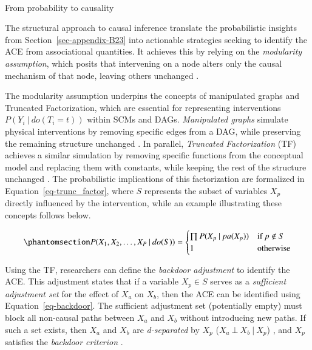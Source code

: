 \documentclass[
  authoryear,
  review,
  1p]{elsarticle}
\makeatletter
\let\oldparagraph\paragraph
\renewcommand{\paragraph}{
    \@ifstar
      \xxxParagraphStar
      \xxxParagraphNoStar
  }
\newcommand{\xxxParagraphStar}[1]{\oldparagraph*{#1}\mbox{}}
\newcommand{\xxxParagraphNoStar}[1]{\oldparagraph{#1}\mbox{}}
\makeatother
\begin{document}
\paragraph{From probability to causality}\label{sec-appendix-B23}

The structural approach to causal inference translate the probabilistic
insights from Section~\ref{sec-appendix-B23} into actionable strategies
seeking to identify the ACE from associational quantities. It achieves
this by relying on the \emph{modularity assumption}, which posits that
intervening on a node alters only the causal mechanism of that node,
leaving others unchanged \citep[pp.~34]{Neal_2020}.

The modularity assumption underpins the concepts of manipulated graphs
and Truncated Factorization, which are essential for representing
interventions \(P(Y_{i} \:|\:do(T_{i}=t))\) within SCMs and DAGs.
\emph{Manipulated graphs} simulate physical interventions by removing
specific edges from a DAG, while preserving the remaining structure
unchanged \citep[pp.~34]{Neal_2020}. In parallel, \emph{Truncated
Factorization} (TF) achieves a similar simulation by removing specific
functions from the conceptual model and replacing them with constants,
while keeping the rest of the structure unchanged \citep{Pearl_2010}.
The probabilistic implications of this factorization are formalized in
Equation~\ref{eq-trunc_factor}, where \(S\) represents the subset of
variables \(X_{p}\) directly influenced by the intervention, while an
example illustrating these concepts follows below.

\begin{equation}\phantomsection\label{eq-trunc_factor}{
P(X_{1}, X_{2}, \dots, X_{P} \:|\:do(S)) =
\begin{cases}
  \prod P(X_{p} \:|\:pa(X_{p}) ) & \text{if} \: p \not\in S \\
  1 \quad & \text{otherwise}
\end{cases}
}\end{equation}

Using the TF, researchers can define the \emph{backdoor adjustment} to
identify the ACE. This adjustment states that if a variable
\(X_{p} \in S\) serves as a \emph{sufficient adjustment set} for the
effect of \(X_{a}\) on \(X_{b}\), then the ACE can be identified using
Equation~\ref{eq-backdoor}. The sufficient adjustment set (potentially
empty) must block all non-causal paths between \(X_{a}\) and \(X_{b}\)
without introducing new paths. If such a set exists, then \(X_{a}\) and
\(X_{b}\) are \emph{d-separated} by \(X_{p}\)
(\(X_{a} \:\bot\:X_{b} \:|\:X_{p}\)) \citep{Pearl_2009}, and \(X_{p}\)
satisfies the \emph{backdoor criterion} \citep[pp.~37]{Neal_2020}.
\end{document}
